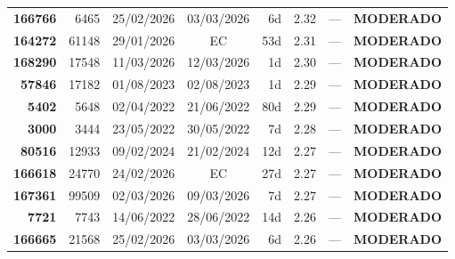 \documentclass[a4paper,10pt]{article}
\begin{document}
\begin{center}
\begin{longtable}{>{\scriptsize}r>{\scriptsize}r>{\scriptsize}c>{\scriptsize}c>{\scriptsize}r>{\scriptsize}r>{\scriptsize}r>{\scriptsize}l}
\textcolor{anomyellow}{\textbf{166766}} & 6465 & 25/02/2026 & 03/03/2026 & 6d & \textcolor{anomyellow}{2.32} & --- & \textcolor{anomyellow}{\textbf{MODERADO}} \\

\textcolor{anomyellow}{\textbf{164272}} & 61148 & 29/01/2026 & \textcolor{anomorange}{EC} & 53d & \textcolor{anomyellow}{2.31} & --- & \textcolor{anomyellow}{\textbf{MODERADO}} \\

\textcolor{anomyellow}{\textbf{168290}} & 17548 & 11/03/2026 & 12/03/2026 & 1d & \textcolor{anomyellow}{2.30} & --- & \textcolor{anomyellow}{\textbf{MODERADO}} \\

\textcolor{anomyellow}{\textbf{57846}} & 17182 & 01/08/2023 & 02/08/2023 & 1d & \textcolor{anomyellow}{2.29} & --- & \textcolor{anomyellow}{\textbf{MODERADO}} \\

\textcolor{anomyellow}{\textbf{5402}} & 5648 & 02/04/2022 & 21/06/2022 & 80d & \textcolor{anomyellow}{2.29} & --- & \textcolor{anomyellow}{\textbf{MODERADO}} \\

\textcolor{anomyellow}{\textbf{3000}} & 3444 & 23/05/2022 & 30/05/2022 & 7d & \textcolor{anomyellow}{2.28} & --- & \textcolor{anomyellow}{\textbf{MODERADO}} \\

\textcolor{anomyellow}{\textbf{80516}} & 12933 & 09/02/2024 & 21/02/2024 & 12d & \textcolor{anomyellow}{2.27} & --- & \textcolor{anomyellow}{\textbf{MODERADO}} \\

\textcolor{anomyellow}{\textbf{166618}} & 24770 & 24/02/2026 & \textcolor{anomorange}{EC} & 27d & \textcolor{anomyellow}{2.27} & --- & \textcolor{anomyellow}{\textbf{MODERADO}} \\

\textcolor{anomyellow}{\textbf{167361}} & 99509 & 02/03/2026 & 09/03/2026 & 7d & \textcolor{anomyellow}{2.27} & --- & \textcolor{anomyellow}{\textbf{MODERADO}} \\

\textcolor{anomyellow}{\textbf{7721}} & 7743 & 14/06/2022 & 28/06/2022 & 14d & \textcolor{anomyellow}{2.26} & --- & \textcolor{anomyellow}{\textbf{MODERADO}} \\

\textcolor{anomyellow}{\textbf{166665}} & 21568 & 25/02/2026 & 03/03/2026 & 6d & \textcolor{anomyellow}{2.26} & --- & \textcolor{anomyellow}{\textbf{MODERADO}} \\


\end{longtable}
\end{center}
\end{document}
